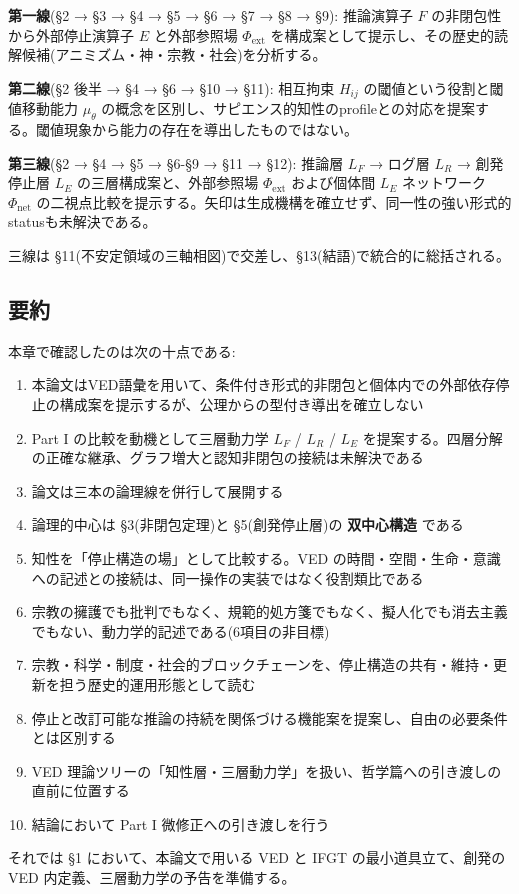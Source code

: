 \textbf{第一線}(\S{}2 → \S{}3 → \S{}4 → \S{}5 → \S{}6 → \S{}7 → \S{}8 → \S{}9):
推論演算子 $F$ の非閉包性から外部停止演算子 $E$ と外部参照場 $\Phi_{\text{ext}}$ を構成案として提示し、その歴史的読解候補(アニミズム・神・宗教・社会)を分析する。

\textbf{第二線}(\S{}2 後半 → \S{}4 → \S{}6 → \S{}10 → \S{}11):
相互拘束 $H_{ij}$ の閾値という役割と閾値移動能力 $\mu_\theta$ の概念を区別し、サピエンス的知性のprofileとの対応を提案する。閾値現象から能力の存在を導出したものではない。

\textbf{第三線}(\S{}2 → \S{}4 → \S{}5 → \S{}6-\S{}9 → \S{}11 → \S{}12):
推論層 $L_F$ → ログ層 $L_R$ → 創発停止層 $L_E$ の三層構成案と、外部参照場 $\Phi_{\text{ext}}$ および個体間 $L_E$ ネットワーク $\Phi_{\text{net}}$ の二視点比較を提示する。矢印は生成機構を確立せず、同一性の強い形式的statusも未解決である。

三線は \S{}11(不安定領域の三軸相図)で交差し、\S{}13(結語)で統合的に総括される。

\bigskip


\subsection{要約}


本章で確認したのは次の十点である:

\begin{enumerate}
\item 本論文はVED語彙を用いて、条件付き形式的非閉包と個体内での外部依存停止の構成案を提示するが、公理からの型付き導出を確立しない
\item Part I の比較を動機として三層動力学 $L_F$ / $L_R$ / $L_E$ を提案する。四層分解の正確な継承、グラフ増大と認知非閉包の接続は未解決である
\item 論文は三本の論理線を併行して展開する
\item 論理的中心は \S{}3(非閉包定理)と \S{}5(創発停止層)の \textbf{双中心構造} である
\item 知性を「停止構造の場」として比較する。VED の時間・空間・生命・意識への記述との接続は、同一操作の実装ではなく役割類比である
\item 宗教の擁護でも批判でもなく、規範的処方箋でもなく、擬人化でも消去主義でもない、動力学的記述である(6項目の非目標)
\item 宗教・科学・制度・社会的ブロックチェーンを、停止構造の共有・維持・更新を担う歴史的運用形態として読む
\item 停止と改訂可能な推論の持続を関係づける機能案を提案し、自由の必要条件とは区別する
\item VED 理論ツリーの「知性層・三層動力学」を扱い、哲学篇への引き渡しの直前に位置する
\item 結論において Part I 微修正への引き渡しを行う
\end{enumerate}


それでは \S{}1 において、本論文で用いる VED と IFGT の最小道具立て、創発の VED 内定義、三層動力学の予告を準備する。

\bigskip
